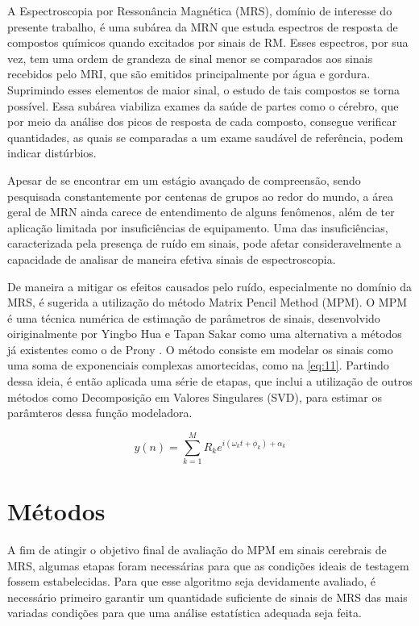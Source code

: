 \documentclass[
12pt,		
twoside, 
a4paper,
chapter=TITLE,
english,			
brazil]{USPSC-classe/USPSC}
\begin{document}
A Espectroscopia por Ressonância Magnética (MRS), domínio de interesse do presente trabalho, é uma subárea da MRN que estuda espectros de resposta de compostos químicos 
quando excitados por sinais de RM. Esses espectros, por sua vez, tem uma ordem de grandeza de sinal menor se comparados aos 
sinais recebidos pelo MRI, que são emitidos principalmente por água e gordura. Suprimindo esses elementos de maior sinal, 
o estudo de tais compostos se torna possível. Essa subárea viabiliza exames da saúde de partes como o cérebro, 
que por meio da análise dos picos de resposta de cada composto, consegue verificar quantidades, as quais se comparadas a um exame 
saudável de referência, podem indicar distúrbios.

Apesar de se encontrar em um estágio avançado de compreensão, sendo pesquisada constantemente por centenas de grupos ao redor do mundo, a 
área geral de MRN ainda carece de entendimento de alguns fenômenos, além de ter aplicação limitada por insuficiências de equipamento. 
Uma das insuficiências, caracterizada pela presença de ruído em sinais, pode afetar consideravelmente a capacidade de 
analisar de maneira efetiva sinais de espectroscopia. 

De maneira a mitigar os efeitos causados pelo ruído, especialmente no domínio da MRS, é sugerida a utilização do método Matrix Pencil Method (MPM). O MPM é uma técnica numérica
de estimação de parâmetros de sinais, desenvolvido oiriginalmente por Yingbo Hua e Tapan Sakar \cite{} como uma alternativa a métodos já existentes 
como o de Prony \cite{}. O método consiste em modelar os sinais como uma soma de exponenciais complexas amortecidas, como na \autoref{eq:11}. Partindo 
dessa ideia, é então aplicada uma série de etapas, que inclui a utilização de outros métodos como Decomposição em Valores Singulares (SVD), para estimar
os parâmteros dessa função modeladora.  


\begin{equation} \label{eq:11}
    y(n) = \sum_{k=1}^{M} R_k e^{i (\omega_k t + \phi_k) + \alpha_k }
\end{equation}

\section{Métodos}

A fim de atingir o objetivo final de avaliação do MPM em sinais cerebrais de MRS, algumas etapas foram 
necessárias para que as condições ideais de testagem fossem estabelecidas. Para que esse algoritmo 
seja devidamente avaliado, é necessário primeiro garantir um quantidade suficiente de sinais de 
MRS das mais variadas condições para que uma análise estatística adequada seja feita. 
\end{document}
